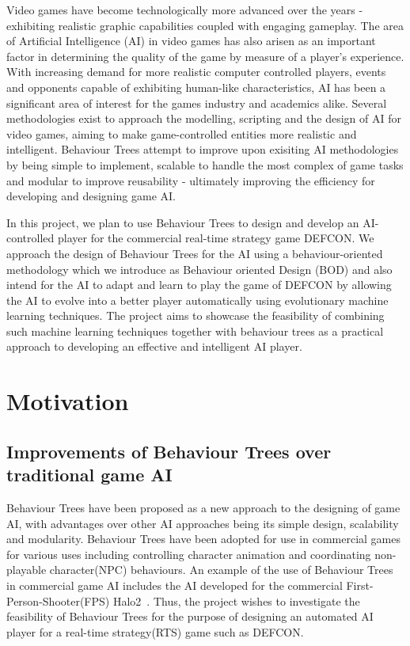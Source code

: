 \documentclass{icldt}
\begin{document}
Video games have become technologically more advanced over the years - exhibiting realistic graphic capabilities coupled with engaging gameplay. The area of Artificial Intelligence (AI) in video games has also arisen as an important factor in determining the quality of the game by measure of a player's experience. With increasing demand for more realistic computer controlled players, events and opponents capable of exhibiting human-like characteristics, AI has been a significant area of interest for the games industry and academics alike. Several methodologies exist to approach the modelling, scripting and the design of AI for video games, aiming to make game-controlled entities more realistic and intelligent. Behaviour Trees attempt to improve upon exisiting AI methodologies by being simple to implement, scalable to handle the most complex of game tasks and modular to improve reusability - ultimately improving the efficiency for developing and designing game AI. 

    In this project, we plan to use Behaviour Trees to design and develop an AI-controlled player for the commercial real-time strategy game DEFCON. We approach the design of Behaviour Trees for the AI using a behaviour-oriented methodology which we introduce as Behaviour oriented Design (BOD) and also intend for the AI to adapt and learn to play the game of DEFCON by allowing the AI to evolve into a better player automatically using evolutionary machine learning techniques. The project aims to showcase the feasibility of combining such machine learning techniques together with behaviour trees as a practical approach to developing an effective and intelligent AI player.

    \newpage
    \section{Motivation}
    
    \subsection{Improvements of Behaviour Trees over traditional game AI}
    Behaviour Trees have been proposed as a new approach to the designing of game AI, with advantages over other AI approaches being its simple design, scalability and modularity. Behaviour Trees have been adopted for use in commercial games for various uses including controlling character animation and coordinating non-playable character(NPC) behaviours. An example of the use of Behaviour Trees in commercial game AI includes the AI developed for the commercial First-Person-Shooter(FPS) Halo2~\cite{isla}. Thus, the project wishes to investigate the feasibility of Behaviour Trees for the purpose of designing an automated AI player for a real-time strategy(RTS) game such as DEFCON.
\end{document}
